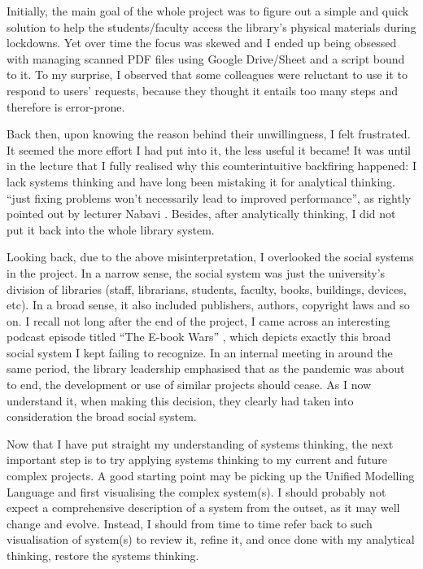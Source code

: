 \documentclass{cep}
\begin{document}
Initially, the main goal of the whole project was to figure out a simple and quick solution to help the students/faculty access the library’s physical materials during lockdowns. Yet over time the focus was skewed and I ended up being obsessed with managing scanned PDF files using Google Drive/Sheet and a script bound to it. To my surprise, I observed that some colleagues were reluctant to use it to respond to users' requests, because they thought it entails too many steps and therefore is error-prone.

Back then, upon knowing the reason behind their unwillingness, I felt frustrated. It seemed the more effort I had put into it, the less useful it became! It was until in the lecture that I fully realised why this counterintuitive backfiring happened: I lack systems thinking and have long been mistaking it for analytical thinking. “just fixing problems won’t necessarily lead to improved performance”, as rightly pointed out by lecturer Nabavi . Besides, after analytically thinking, I did not put it back into the whole library system.

Looking back, due to the above misinterpretation, I overlooked the social systems in the project. In a narrow sense, the social system was just the university’s division of libraries (staff, librarians, students, faculty, books, buildings, devices, etc). In a broad sense, it also included publishers, authors, copyright laws and so on. I recall not long after the end of the project, I came across an interesting podcast episode titled “The E-book Wars” \parencite{site:npr}, which depicts exactly this broad social system I kept failing to recognize. In an internal meeting in around the same period, the library leadership emphasised that as the pandemic was about to end, the development or use of similar projects should cease. As I now understand it, when making this decision, they clearly had taken into consideration the broad social system.

Now that I have put straight my understanding of systems thinking, the next important step is to try applying systems thinking to my current and future complex projects. A good starting point may be picking up the Unified Modelling Language \parencite{wiki:uml} and first visualising the complex system(s). I should probably not expect a comprehensive description of a system from the outset, as it may well change and evolve. Instead, I should from time to time refer back to such visualisation of system(s) to review it, refine it, and once done with my analytical thinking, restore the systems thinking.

\printbibliography
\end{document}
